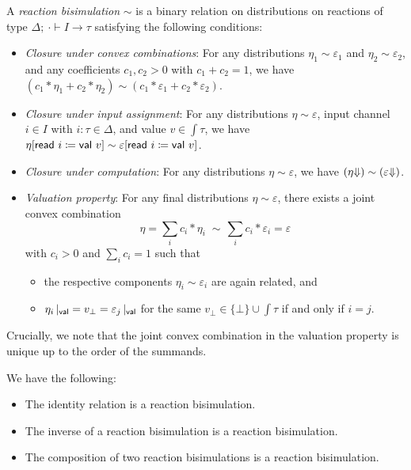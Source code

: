 \begin{definition}
A \emph{reaction bisimulation} $\sim$ is a binary relation on distributions on reactions of type $\Delta; \ \cdot \vdash I \to \tau$ satisfying the following conditions:
\begin{itemize}
\item \emph{Closure under convex combinations}: For any distributions $\eta_1 \sim \varepsilon_1$ and $\eta_2 \sim \varepsilon_2$, and any coefficients $c_1, c_2 > 0$ with $c_1 + c_2 = 1$, we have $(c_1 * \eta_1 + c_2 * \eta_2) \sim (c_1 * \varepsilon_1 + c_2 * \varepsilon_2)$.

\item \emph{Closure under input assignment}: For any distributions $\eta \sim \varepsilon$, input channel $i \in I$ with $i : \tau \in \Delta$, and value $v \in \int{\tau}$, we have $\eta[\mathsf{read} \ i \coloneqq \mathsf{val} \ v] \sim \varepsilon[\mathsf{read} \ i \coloneqq \mathsf{val} \ v]$.

\item \emph{Closure under computation}: For any distributions $\eta \sim \varepsilon$, we have $({\eta \hspace{-2.5pt} \Downarrow}) \sim ({\varepsilon \hspace{-2.5pt} \Downarrow})$.

\item \emph{Valuation property}: For any final distributions $\eta \sim \varepsilon$, there exists a joint convex combination \[\eta = \sum_i c_i * \eta_i \; \sim \, \sum_i c_i * \varepsilon_i = \varepsilon\]
with $c_i > 0$ and $\sum_i c_i = 1$ such that
\begin{itemize}
\item the respective components $\eta_i \sim \varepsilon_i$ are again related, and
\item $\eta_i \, |_{\mathsf{val}} = v_\bot = \varepsilon_j \, |_{\mathsf{val}}$ for the same $v_\bot \in \{\bot\} \cup \int{\tau}$ if and only if $i = j$.
\end{itemize}
\end{itemize}
\end{definition}

\noindent Crucially, we note that the joint convex combination in the valuation property is unique up to the order of the summands.

\begin{lemma}
We have the following: 
\begin{itemize}
\item The identity relation is a reaction bisimulation.
\item The inverse of a reaction bisimulation is a reaction bisimulation.
\item The composition of two reaction bisimulations is a reaction bisimulation.
\end{itemize}
\end{lemma}

